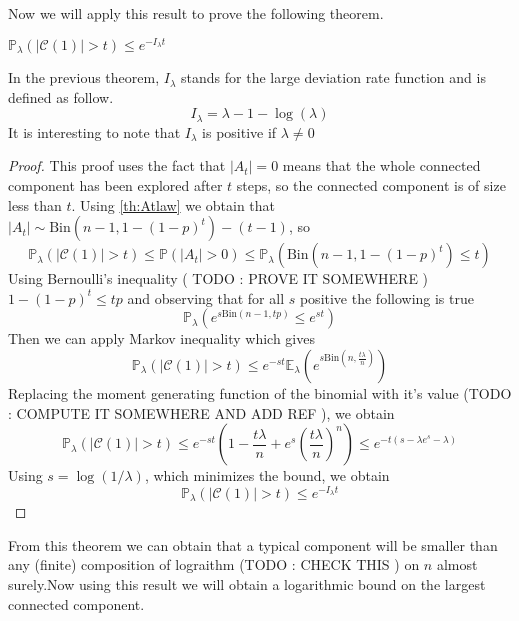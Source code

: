 Now we will apply this result to prove the following theorem.
\begin{theorem}\label{th:uplambda}
	$\mathbb{P}_{\lambda}(|\mathcal{C}(1)| >t) \leq e^{-I_{\lambda}t}$
\end{theorem}
In the previous theorem, $I_{\lambda}$ stands for the large deviation rate function and is defined as follow.
\begin{equation}
	I_{\lambda} = \lambda - 1 - \log(\lambda)
\end{equation}
It is interesting to note that $I_\lambda$ is positive if $\lambda \neq 0$
\begin{proof}
	This proof uses the fact that $|A_t| = 0$ means that the whole connected component has been explored after $t$ steps, so the connected component is of size less than $t$.
	Using \ref{th:Atlaw} we obtain that $|A_t| \sim \text{Bin}(n-1, 1-(1-p)^t) - (t-1)$, so 
	\begin{equation}
		\mathbb{P}_{\lambda}(|\mathcal{C}(1)| > t ) \leq \mathbb{P}(|A_t|>0) \leq \mathbb{P}_{\lambda}(\text{Bin}(n-1, 1-(1-p)^t) \leq t)
	\end{equation}
	Using Bernoulli's inequality ( TODO : PROVE IT SOMEWHERE ) $ 1- (1-p)^t \leq tp$ and observing that for all $s$ positive the following is true
	\begin{equation}
		\mathbb{P}_{\lambda}(e^{s\text{Bin}(n-1, tp)} \leq e^{st}) 
	\end{equation}
	Then we can apply Markov inequality which gives 
	\begin{equation}
		\mathbb{P}_{\lambda}(|\mathcal{C}(1)| > t ) \leq e^{-st}\mathbb{E}_{\lambda}(e^{s\text{Bin}(n, \frac{t\lambda}{n})})
	\end{equation}
	Replacing the moment generating function of the binomial with it's value (TODO : COMPUTE IT SOMEWHERE AND ADD REF ), we obtain 
	\begin{equation}
		\mathbb{P}_{\lambda}(|\mathcal{C}(1)| > t ) \leq e^{-st}(1 - \frac{t\lambda}{n} + e^s(\frac{t\lambda}{n})^n) \leq e^{-t(s - \lambda e^s - \lambda)}
	\end{equation}
	Using $s=\log(1/\lambda)$, which minimizes the bound, we obtain
	\begin{equation}
		\mathbb{P}_{\lambda}(|\mathcal{C}(1)| >t) \leq e^{-I_{\lambda}t}
	\end{equation}
\end{proof}
From this theorem we can obtain that a typical component will be smaller than any (finite) composition of lograithm (TODO : CHECK THIS ) on $n$ almost surely.Now using this result we will obtain a logarithmic bound on the largest connected component.
